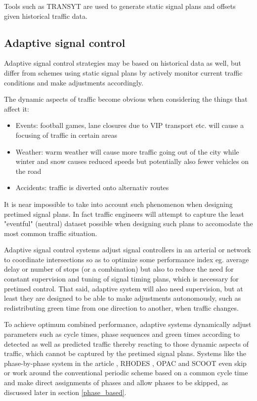Tools such as TRANSYT are used to generate static signal plans and offsets given historical traffic data.

\subsection{Adaptive signal control}
Adaptive signal control strategies may be based on historical data as well, but differ from schemes using static signal plans by actively monitor current traffic conditions and make adjustments accordingly.

The dynamic aspects of traffic become obvious when considering the things that affect it:

\begin{itemize}
\item Events: football games, lane closures due to VIP transport etc. will cause a focusing of traffic in certain areas
\item Weather: warm weather will cause more traffic going out of the city while winter and snow causes reduced speeds but potentially also fewer vehicles on the road
\item Accidents: traffic is diverted onto alternativ routes
\end{itemize}

It is near impossible to take into account such phenomenon when designing pretimed signal plans. In fact traffic engineers will attempt to capture the least "eventful" (neutral) dataset possible when designing such plans to accomodate the most common traffic situation.

Adaptive signal control systems adjust signal controllers in an arterial or network to coordinate intersections so as to optimize some performance index eg. average delay or number of stops (or a combination) but also to reduce the need for constant supervision and tuning of signal timing plans, which is necessary for pretimed control. That said, adaptive system will also need supervision, but at least they are designed to be able to make adjustments autonomously, such as redistributing green time from one direction to another, when traffic changes.

To achieve optimum combined performance, adaptive systems dynamically adjust parameters such as cycle times, phase sequences and green times according to detected as well as predicted traffic thereby reacting to those dynamic aspects of traffic, which cannot be captured by the pretimed signal plans. Systems like the phase-by-phase system in the article \cite{phase_by_phase}, RHODES \cite{rhodes}, OPAC \cite{opac} and SCOOT \cite{scoot} even skip or work around the conventional periodic scheme based on a common cycle time and make direct assignments of phases and allow phases to be skipped, as discussed later in section \ref{phase_based}. 

